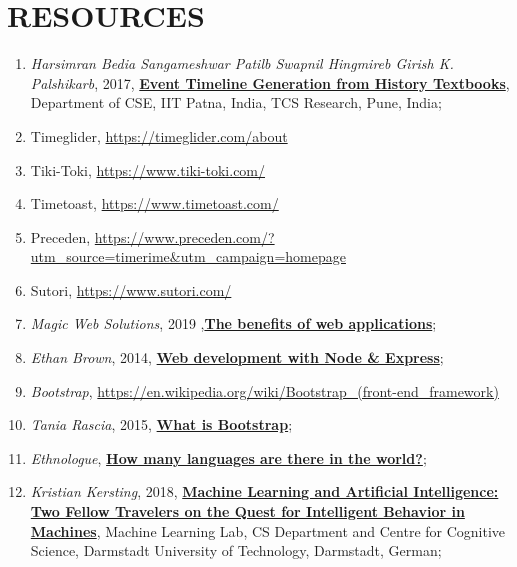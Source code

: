 \documentclass{report}
\begin{document}
\section* {RESOURCES}
\begin{enumerate}
\item \textit{Harsimran Bedia Sangameshwar Patilb Swapnil Hingmireb Girish K. Palshikarb},  2017, \href{https://aclweb.org/anthology/W17-5912}{\textbf{Event Timeline Generation from History Textbooks}}, Department of CSE, IIT Patna, India, TCS Research, Pune, India;

\item Timeglider, \url{https://timeglider.com/about}

\item Tiki-Toki, \url{https://www.tiki-toki.com/}

\item Timetoast, \url{https://www.timetoast.com/}

\item Preceden, \url{https://www.preceden.com/?utm_source=timerime&utm_campaign=homepage}

\item Sutori, \url{https://www.sutori.com/}

\item \textit{Magic Web Solutions}, 2019 ,\href{https://www.magicwebsolutions.co.uk/blog/the-benefits-of-web-based-applications.htm}{\textbf{The benefits of web applications}};

\item \textit{Ethan Brown}, 2014, \href{http://www.vanmeegern.de/fileadmin/user_upload/PDF/Web_Development_with_Node_Express.pdf}{\textbf{Web development with Node \& Express}};

\item \textit{Bootstrap}, \url{https://en.wikipedia.org/wiki/Bootstrap_(front-end_framework)}

\item \textit{Tania Rascia}, 2015, \href{https://www.taniarascia.com/what-is-bootstrap-and-how-do-i-use-it/}{\textbf{What is Bootstrap}};

\item \textit{Ethnologue}, \href{https://www.ethnologue.com/guides/how-many-languages}{\textbf{How many languages are there in the world?}};

\item \textit{Kristian Kersting}, 2018, \href{https://ml-research.github.io/papers/kersting2018aiml_frontiers.pdf}{\textbf{Machine Learning and Artificial Intelligence: Two Fellow Travelers on the Quest for Intelligent Behavior in Machines}}, Machine Learning Lab, CS Department and Centre for Cognitive Science, Darmstadt University of Technology, Darmstadt, German;


\end{enumerate}
\end{document}
